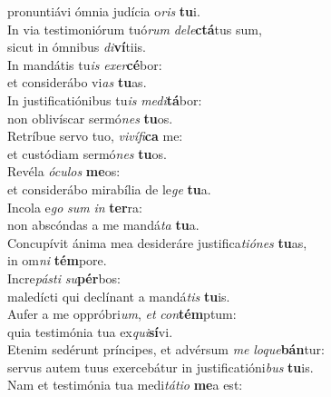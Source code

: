 \oddverse pronuntiávi ómnia judícia o\textit{ris} \textbf{tu}i.\\
\evenverse In via testimoniórum tuó\textit{rum} \textit{de}\textit{le}\textbf{ctá}tus sum,~\*\\
\evenverse sicut in ómnibus \textit{di}\textbf{ví}tiis.\\
\oddverse In mandátis tu\textit{is} \textit{e}\textit{xer}\textbf{cé}bor:~\*\\
\oddverse et considerábo vi\textit{as} \textbf{tu}as.\\
\evenverse In justificatiónibus tu\textit{is} \textit{me}\textit{di}\textbf{tá}bor:~\*\\
\evenverse non oblivíscar sermó\textit{nes} \textbf{tu}os.\\
\oddverse Retríbue servo tuo, \textit{vi}\textit{ví}\textit{fi}\textbf{ca} me:~\*\\
\oddverse et custódiam sermó\textit{nes} \textbf{tu}os.\\
\evenverse Revéla \textit{ó}\textit{cu}\textit{los} \textbf{me}os:~\*\\
\evenverse et considerábo mirabília de le\textit{ge} \textbf{tu}a.\\
\oddverse Incola e\textit{go} \textit{sum} \textit{in} \textbf{ter}ra:~\*\\
\oddverse non abscóndas a me mandá\textit{ta} \textbf{tu}a.\\
\evenverse Concupívit ánima mea desideráre justifica\textit{ti}\textit{ó}\textit{nes} \textbf{tu}as,~\*\\
\evenverse in om\textit{ni} \textbf{tém}pore.\\
\oddverse Incre\textit{pá}\textit{sti} \textit{su}\textbf{pér}bos:~\*\\
\oddverse maledícti qui declínant a mandá\textit{tis} \textbf{tu}is.\\
\evenverse Aufer a me oppróbri\textit{um}, \textit{et} \textit{con}\textbf{tém}ptum:~\*\\
\evenverse quia testimónia tua ex\textit{qui}\textbf{sí}vi.\\
\oddverse Etenim sedérunt príncipes, et advérsum \textit{me} \textit{lo}\textit{que}\textbf{bán}tur:~\*\\
\oddverse servus autem tuus exercebátur in justificatióni\textit{bus} \textbf{tu}is.\\
\evenverse Nam et testimónia tua medi\textit{tá}\textit{ti}\textit{o} \textbf{me}a est:~\*\\
